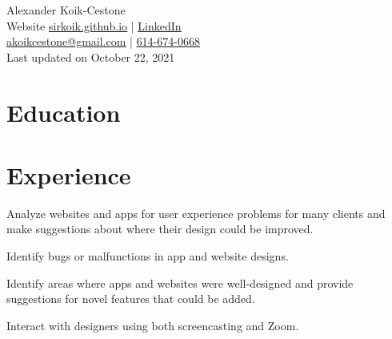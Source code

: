 \documentclass[]{deedy-resume-openfont}
\begin{document}
%
%

%
%


\begin{center}
{\Huge Alexander Koik-Cestone} \\
Website \href{https://sirkoik.github.io}{\underline{sirkoik.github.io}} | 
\href{https://www.linkedin.com/in/alexander-koik-cestone-89304556/}{\underline{LinkedIn}} \\
\href{mailto:akoikcestone@gmail.com}{\underline{akoikcestone@gmail.com}} |  \href{tel:614-674-0668}{\underline{614-674-0668}} \\
Last updated on October 22, 2021
\end{center}




\sectionsep
{}
\sectionsep

\section{Education}
\sectionsep

\sectionsep

\section{Experience}

\begin{tightemize}
\item Analyze websites and apps for user experience problems for many clients and make suggestions about where their design could be improved.
\item Identify bugs or malfunctions in app and website designs.
\item Identify areas where apps and websites were well-designed and provide suggestions for novel features that could be added.
\item Interact with designers using both screencasting and Zoom.
\end{tightemize}
\sectionsep
\end{document}
